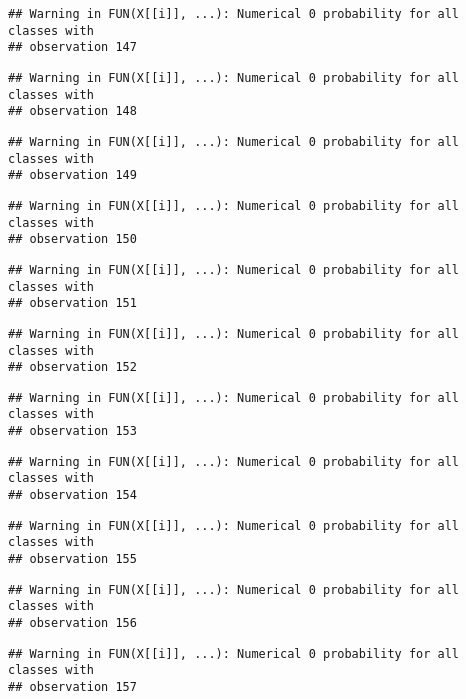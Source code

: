 \documentclass[
]{article}
\begin{document}
\begin{verbatim}
## Warning in FUN(X[[i]], ...): Numerical 0 probability for all classes with
## observation 147
\end{verbatim}

\begin{verbatim}
## Warning in FUN(X[[i]], ...): Numerical 0 probability for all classes with
## observation 148
\end{verbatim}

\begin{verbatim}
## Warning in FUN(X[[i]], ...): Numerical 0 probability for all classes with
## observation 149
\end{verbatim}

\begin{verbatim}
## Warning in FUN(X[[i]], ...): Numerical 0 probability for all classes with
## observation 150
\end{verbatim}

\begin{verbatim}
## Warning in FUN(X[[i]], ...): Numerical 0 probability for all classes with
## observation 151
\end{verbatim}

\begin{verbatim}
## Warning in FUN(X[[i]], ...): Numerical 0 probability for all classes with
## observation 152
\end{verbatim}

\begin{verbatim}
## Warning in FUN(X[[i]], ...): Numerical 0 probability for all classes with
## observation 153
\end{verbatim}

\begin{verbatim}
## Warning in FUN(X[[i]], ...): Numerical 0 probability for all classes with
## observation 154
\end{verbatim}

\begin{verbatim}
## Warning in FUN(X[[i]], ...): Numerical 0 probability for all classes with
## observation 155
\end{verbatim}

\begin{verbatim}
## Warning in FUN(X[[i]], ...): Numerical 0 probability for all classes with
## observation 156
\end{verbatim}

\begin{verbatim}
## Warning in FUN(X[[i]], ...): Numerical 0 probability for all classes with
## observation 157
\end{verbatim}
\end{document}
